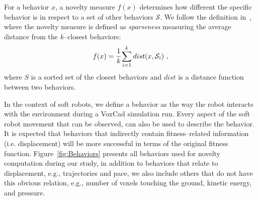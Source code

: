 \documentclass{sig-alternate}
\begin{document}
For a behavior $x$, a novelty measure $f(x)$ determines how different the specific behavior is in respect to a set of other behaviors $\mathcal{S}$. We follow the definition in~\cite{lehman2008exploiting,lehman2011abandoning}, where the novelty measure is defined as \emph{sparseness} measuring the average distance from the $k$--closest behaviors:
\begin{equation}
\label{sparsenessEquation}
f(x) = \cfrac{1}{k} \sum_{i=1}^{k} dist(x, \mathcal{S}_i)\ , 
\end{equation}
where $S$ is a sorted set of the closest behaviors and $dist$ is a distance function between two behaviors.





In the context of soft robots, we define a behavior as the way the robot interacts with the environment during a VoxCad simulation run. Every aspect of the soft robot movement that can be observed, can also be used to describe the behavior. 
It is expected that behaviors that indirectly contain fitness--related information (i.e. displacement) will be more successful in terms of the original fitness function. Figure~\ref{fig:Behaviors} presents all behaviors used for novelty computation during our study, in addition to behaviors that relate to displacement, e.g., trajectories and pace, we also include others that do not have this obvious relation, e.g., number of voxels touching the ground, kinetic energy, and pressure.
\end{document}
